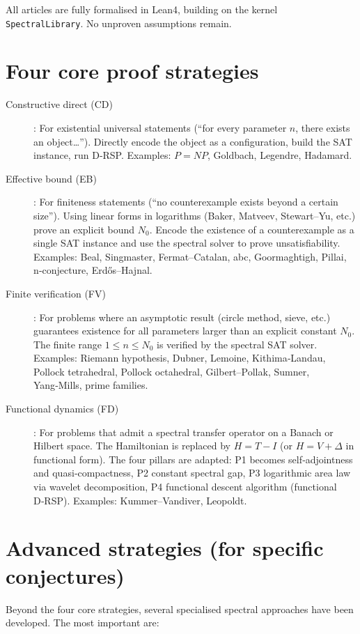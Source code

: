 \documentclass[11pt,a4paper]{article}
\begin{document}
All articles are fully formalised in Lean4, building on the kernel \texttt{SpectralLibrary}. No unproven assumptions remain.

\section{Four core proof strategies}

\begin{description}
\item[Constructive direct (CD)]: For existential universal statements (“for every parameter \(n\), there exists an object…”). Directly encode the object as a configuration, build the SAT instance, run D‑RSP. Examples: \(P=NP\), Goldbach, Legendre, Hadamard.
\item[Effective bound (EB)]: For finiteness statements (“no counterexample exists beyond a certain size”). Using linear forms in logarithms (Baker, Matveev, Stewart–Yu, etc.) prove an explicit bound \(N_0\). Encode the existence of a counterexample as a single SAT instance and use the spectral solver to prove unsatisfiability. Examples: Beal, Singmaster, Fermat–Catalan, abc, Goormaghtigh, Pillai, n‑conjecture, Erdős–Hajnal.
\item[Finite verification (FV)]: For problems where an asymptotic result (circle method, sieve, etc.) guarantees existence for all parameters larger than an explicit constant \(N_0\). The finite range \(1\le n\le N_0\) is verified by the spectral SAT solver. Examples: Riemann hypothesis, Dubner, Lemoine, Kithima‑Landau, Pollock tetrahedral, Pollock octahedral, Gilbert–Pollak, Sumner, Yang‑Mills, prime families.
\item[Functional dynamics (FD)]: For problems that admit a spectral transfer operator on a Banach or Hilbert space. The Hamiltonian is replaced by \(H = T - I\) (or \(H = V + \Delta\) in functional form). The four pillars are adapted: P1 becomes self‑adjointness and quasi‑compactness, P2 constant spectral gap, P3 logarithmic area law via wavelet decomposition, P4 functional descent algorithm (functional D‑RSP). Examples: Kummer–Vandiver, Leopoldt.
\end{description}

\section{Advanced strategies (for specific conjectures)}

Beyond the four core strategies, several specialised spectral approaches have been developed. The most important are:
\end{document}
